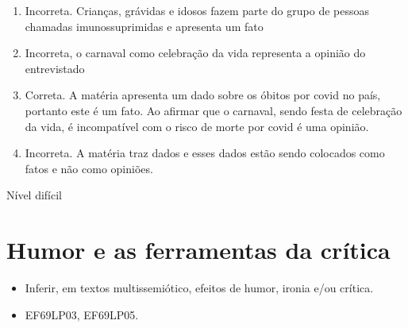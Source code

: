 {{\begin{escolha}
\begin{enumerate}
\def\labelenumi{\alph{enumi})}
\item
  Incorreta. Crianças, grávidas e idosos fazem parte do grupo de pessoas
  chamadas imunossuprimidas e apresenta um fato
\item
  Incorreta, o carnaval como celebração da vida representa a opinião do
  entrevistado
\item
  Correta. A matéria apresenta um dado sobre os óbitos por covid no
  país, portanto este é um fato. Ao afirmar que o carnaval, sendo festa
  de celebração da vida, é incompatível com o risco de morte por covid é
  uma opinião.
\item
  Incorreta. A matéria traz dados e esses dados estão sendo colocados
  como fatos e não como opiniões.
\end{enumerate}

Nível difícil


\chapter{Humor e as ferramentas da crítica}


\begin{itemize}

  \item Inferir, em textos multissemiótico, efeitos de humor, ironia e/ou
  crítica.

\end{itemize}


\begin{itemize}

  \item EF69LP03, EF69LP05.

\end{itemize}


\end{escolha}}}
